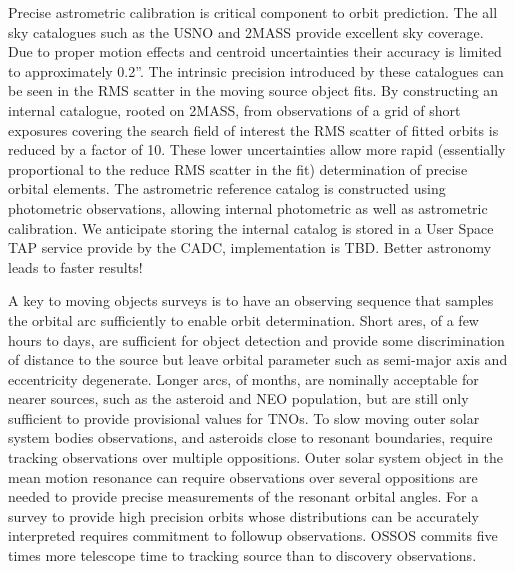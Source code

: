Precise astrometric calibration is critical component to orbit prediction.
The all sky catalogues such as the USNO and 2MASS provide excellent sky coverage.
Due to proper motion effects and centroid uncertainties their accuracy  is limited to approximately 0.2''.
The intrinsic precision introduced by these catalogues can be seen in the RMS scatter in the moving source object fits. 
By constructing an internal catalogue, rooted on 2MASS, from observations of a grid of short exposures covering the search field of interest the RMS scatter of fitted orbits is reduced by a factor of 10.
These lower uncertainties allow more rapid (essentially proportional to the reduce RMS scatter in the fit) determination of precise orbital elements.
The astrometric reference catalog is constructed using photometric observations, allowing internal photometric as well as astrometric calibration.
We anticipate storing the internal catalog is stored in a User Space TAP service provide by the CADC, implementation is TBD. 
Better astronomy leads to faster results!


A key to moving objects surveys is to have an observing sequence that samples the orbital arc sufficiently to enable orbit determination.
Short ares, of a few hours to days, are sufficient for object detection and provide some discrimination of distance to the source but leave orbital parameter such as semi-major axis and eccentricity degenerate. 
Longer arcs, of months, are nominally acceptable for nearer sources, such as the asteroid and NEO population, but are still only sufficient to provide provisional values for TNOs.
To slow moving outer solar system bodies observations, and asteroids close to resonant boundaries, require tracking observations over multiple oppositions.  
Outer solar system object in the mean motion resonance can require observations over several oppositions are needed to provide precise measurements of the resonant orbital angles.  
For a survey to provide high precision orbits whose distributions can be accurately interpreted requires commitment to followup observations.  
OSSOS commits five times more telescope time to tracking source than to discovery observations. 

